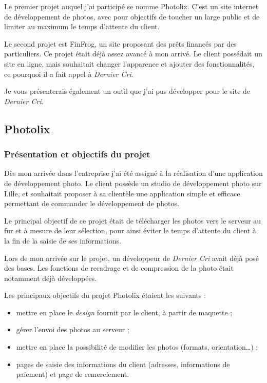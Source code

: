 \bigskip

Le premier projet auquel j'ai participé se nomme Photolix. C'est un site
internet de développement de photos, avec pour objectifs de toucher un
large public et de limiter au maximum le temps d'attente du client.

\bigskip

Le second projet est FinFrog, un site proposant des prêts financés par
des particuliers. Ce projet était déjà assez avancé à mon arrivé. Le
client possédait un site en ligne, mais souhaitait changer l'apparence
et ajouter des fonctionnalités, ce pourquoi il a fait appel à
\emph{Dernier Cri}.

\bigskip

Je vous présenterais également un outil que j'ai pus développer pour le
site de \emph{Dernier Cri}.

\bigskip

\subsection{Photolix}\label{photolix}

\subsubsection{Présentation et objectifs du
projet}\label{pruxe9sentation-et-objectifs-du-projet}

\bigskip

Dès mon arrivée dans l'entreprise j'ai été assigné à la réalisation
d'une application de développement photo. Le client possède un studio de
développement photo sur Lille, et souhaitait proposer à sa clientèle une
application simple et efficace permettant de commander le développement
de photos.

\bigskip

Le principal objectif de ce projet était de télécharger les photos vers
le serveur au fur et à mesure de leur sélection, pour ainsi éviter le
temps d'attente du client à la fin de la saisie de ses informations.

\bigskip

Lors de mon arrivée sur le projet, un développeur de \emph{Dernier Cri}
avait déjà posé des bases. Les fonctions de recadrage et de compression
de la photo était notamment déjà développées.

\bigskip

Les principaux objectifs du projet Photolix étaient les suivants :

\begin{itemize}
\tightlist
\item
  mettre en place le \emph{design} fournit par le client, à partir de
  maquette ;
\item
  gérer l'envoi des photos au serveur ;
\item
  mettre en place la possibilité de modifier les photos (formats,
  orientation\ldots{}) ;
\item
  pages de saisie des informations du client (adresses, informations de
  paiement) et page de remerciement.
\end{itemize}

